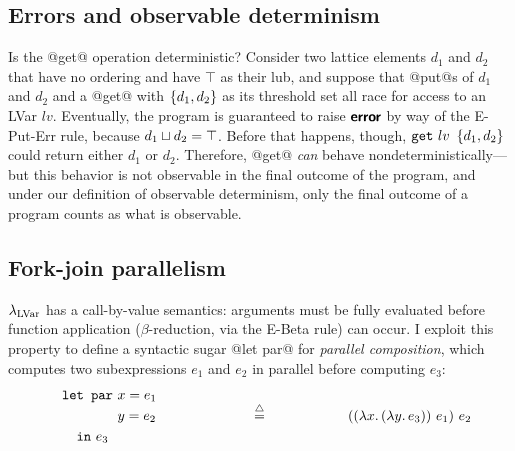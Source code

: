 \subsection{Errors and observable determinism}\label{subsection:lvars-errors-and-observable-determinism}

Is the @get@ operation deterministic?  Consider two lattice elements
$d_1$ and $d_2$ that have no ordering and have $\top$ as their lub,
and suppose that @put@s of $d_1$ and $d_2$ and a @get@ with
$\left\{d_1, d_2\right\}$ as its threshold set all race for access to an LVar
$lv$.  Eventually, the program is guaranteed to raise $\textbf{\textsf{error}}$ by way
of the {\sc E-Put-Err} rule, because $d_1 \sqcup d_2 = \top$.  Before
that happens, though, $\mbox{\texttt{get}}~lv~\left\{d_1, d_2\right\}$ could return
either $d_1$ or $d_2$.  Therefore, @get@ \emph{can} behave
nondeterministically---but this behavior is not observable in the
final outcome of the program, and under our definition of observable
determinism, only the final outcome of a program counts as what is
observable.

\subsection{Fork-join parallelism}\label{subsection:fork-join}

$\lambda_{\textrm{LVar}}$ has a call-by-value semantics: arguments must be fully
evaluated before function application ($\beta$-reduction, via the {\sc
  E-Beta} rule) can occur.  I exploit this property to define a
syntactic sugar @let par@ for \emph{parallel composition}, which
computes two subexpressions $e_1$ and $e_2$ in parallel before
computing $e_3$:
\begin{displaymath}
\begin{minipage}[b]{2in}
  \begin{equation*}
\begin{split}
& \LETPAR ~x = e_1 \\ 
& \letparspace ~y = e_2 \\
& \letspace \IN~e_3 
\end{split}
\end{equation*}
\end{minipage}
\begin{minipage}[b]{1in}
\centering
$\defeq$
\end{minipage}
\begin{minipage}[b]{2in}
\begin{equation*}
  \app{(\app{(\lam{x}{(\lam{y}{e_3})})}{e_1})}{e_2}
\end{equation*}
\end{minipage}
\end{displaymath}

